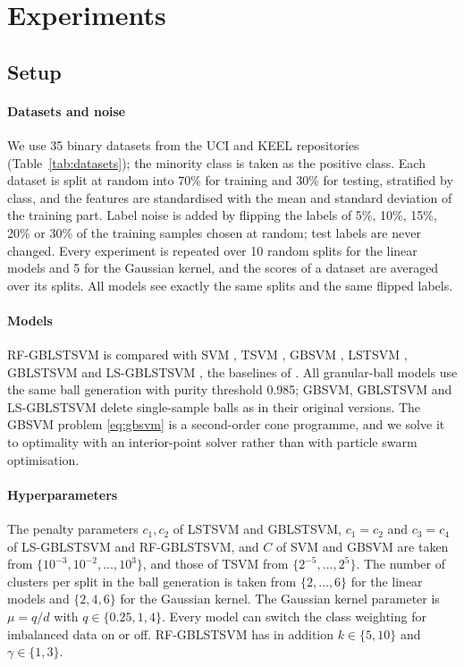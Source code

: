 \documentclass[preprint,12pt]{elsarticle}
\newcommand{\RF}{RF-GBLSTSVM}
\begin{document}
\section{Experiments}
\label{sec:experiments}

\subsection{Setup}
\label{sec:setup}

\paragraph{Datasets and noise} We use 35 binary datasets from the UCI \cite{uci} and KEEL \cite{keel} repositories (Table~\ref{tab:datasets}); the minority class is taken as the positive class. Each dataset is split at random into 70\% for training and 30\% for testing, stratified by class, and the features are standardised with the mean and standard deviation of the training part. Label noise is added by flipping the labels of 5\%, 10\%, 15\%, 20\% or 30\% of the training samples chosen at random; test labels are never changed. Every experiment is repeated over 10 random splits for the linear models and 5 for the Gaussian kernel, and the scores of a dataset are averaged over its splits. All models see exactly the same splits and the same flipped labels.



\paragraph{Models} \RF{} is compared with SVM \cite{cortes1995}, TSVM \cite{jayadeva2007}, GBSVM \cite{xia2022gbsvm}, LSTSVM \cite{kumar2009}, GBLSTSVM and LS-GBLSTSVM \cite{tanveer2024gblstsvm}, the baselines of \cite{tanveer2024gblstsvm}. All granular-ball models use the same ball generation with purity threshold 0.985; GBSVM, GBLSTSVM and LS-GBLSTSVM delete single-sample balls as in their original versions. The GBSVM problem \eqref{eq:gbsvm} is a second-order cone programme, and we solve it to optimality with an interior-point solver \cite{diamond2016,goulart2024} rather than with particle swarm optimisation.

\paragraph{Hyperparameters} The penalty parameters $c_1,c_2$ of LSTSVM and GBLSTSVM, $c_1=c_2$ and $c_3=c_4$ of LS-GBLSTSVM and \RF{}, and $C$ of SVM and GBSVM are taken from $\{10^{-3},10^{-2},\dots,10^{3}\}$, and those of TSVM from $\{2^{-5},\dots,2^{5}\}$. The number of clusters per split in the ball generation is taken from $\{2,\dots,6\}$ for the linear models and $\{2,4,6\}$ for the Gaussian kernel. The Gaussian kernel parameter is $\mu=q/d$ with $q\in\{0.25,1,4\}$. Every model can switch the class weighting for imbalanced data on or off. \RF{} has in addition $k\in\{5,10\}$ and $\gamma\in\{1,3\}$.
\end{document}
